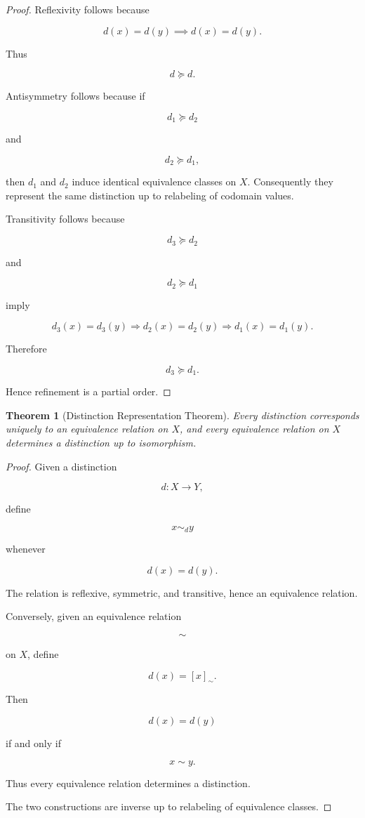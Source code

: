 \documentclass[12pt,oneside]{article}
\newtheorem{theorem}{Theorem}[section] \newtheorem{lemma}[theorem]{Lemma} \newtheorem{proposition}[theorem]{Proposition} \newtheorem{corollary}[theorem]{Corollary}
\theoremstyle{definition}
\begin{document}
\begin{proof}

Reflexivity follows because

\[
d(x)=d(y)
\implies
d(x)=d(y).
\]

Thus

\[
d\succeq d.
\]

Antisymmetry follows because if

\[
d_1\succeq d_2
\]

and

\[
d_2\succeq d_1,
\]

then \(d_1\) and \(d_2\) induce identical equivalence classes on \(X\). Consequently they represent the same distinction up to relabeling of codomain values.

Transitivity follows because

\[
d_3\succeq d_2
\]

and

\[
d_2\succeq d_1
\]

imply

\[
d_3(x)=d_3(y)
\Rightarrow
d_2(x)=d_2(y)
\Rightarrow
d_1(x)=d_1(y).
\]

Therefore

\[
d_3\succeq d_1.
\]

Hence refinement is a partial order.

\end{proof}

\begin{theorem}[Distinction Representation Theorem]

Every distinction corresponds uniquely to an equivalence relation on \(X\), and every equivalence relation on \(X\) determines a distinction up to isomorphism.

\end{theorem}

\begin{proof}

Given a distinction

\[
d:X\rightarrow Y,
\]

define

\[
x\sim_d y
\]

whenever

\[
d(x)=d(y).
\]

The relation is reflexive, symmetric, and transitive, hence an equivalence relation.

Conversely, given an equivalence relation

\[
\sim
\]

on \(X\), define

\[
d(x)
=
[x]_\sim.
\]

Then

\[
d(x)=d(y)
\]

if and only if

\[
x\sim y.
\]

Thus every equivalence relation determines a distinction.

The two constructions are inverse up to relabeling of equivalence classes.

\end{proof}
\end{document}
